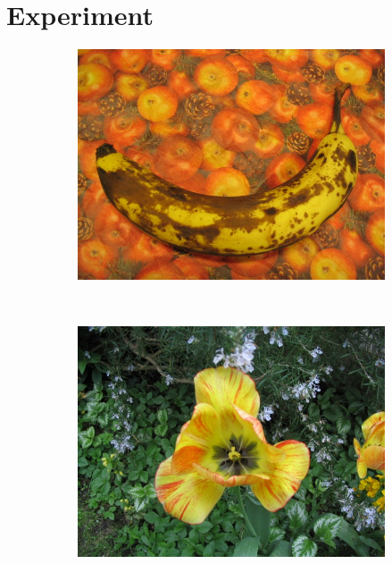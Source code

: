 \documentclass[10pt,twocolumn,letterpaper]{article}
\begin{document}
\section{Experiment}\label{sec:experiment}

\begin{figure}[t]
        \centering
        \begin{subfigure}[b]{0.15\textwidth}
        \includegraphics[width=\textwidth]{figures/input/banana2.jpg}
        \end{subfigure}%
        ~
        \begin{subfigure}[b]{0.15\textwidth}
                \includegraphics[width=\textwidth]{figures/input/flower.jpg}
        \end{subfigure}%

\end{figure}
\end{document}
